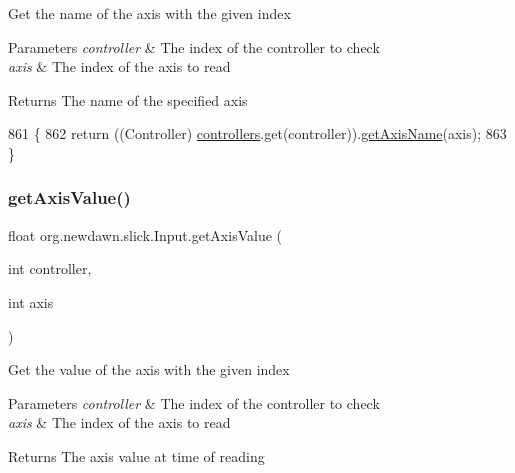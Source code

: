 Get the name of the axis with the given index


\begin{DoxyParams}{Parameters}
{\em controller} & The index of the controller to check \\
\hline
{\em axis} & The index of the axis to read \\
\hline
\end{DoxyParams}
\begin{DoxyReturn}{Returns}
The name of the specified axis 
\end{DoxyReturn}

\begin{DoxyCode}
861                                                         \{
862         \textcolor{keywordflow}{return} ((Controller) \mbox{\hyperlink{classorg_1_1newdawn_1_1slick_1_1_input_a1bcc91bf0db9efc578bd934a8ed9ce67}{controllers}}.get(controller)).\mbox{\hyperlink{classorg_1_1newdawn_1_1slick_1_1_input_a3840d085b002b57fa88c9fe6268523e9}{getAxisName}}(axis);
863     \}
\end{DoxyCode}
\mbox{\label{classorg_1_1newdawn_1_1slick_1_1_input_ad9bfc0d7d50ac52a8e6f0cca6a8e470b}} 
\subsubsection{\texorpdfstring{get\+Axis\+Value()}{getAxisValue()}}
{\footnotesize\ttfamily float org.\+newdawn.\+slick.\+Input.\+get\+Axis\+Value (\begin{DoxyParamCaption}\item[{int}]{controller,  }\item[{int}]{axis }\end{DoxyParamCaption})\hspace{0.3cm}{\ttfamily [inline]}}

Get the value of the axis with the given index


\begin{DoxyParams}{Parameters}
{\em controller} & The index of the controller to check \\
\hline
{\em axis} & The index of the axis to read \\
\hline
\end{DoxyParams}
\begin{DoxyReturn}{Returns}
The axis value at time of reading 
\end{DoxyReturn}

